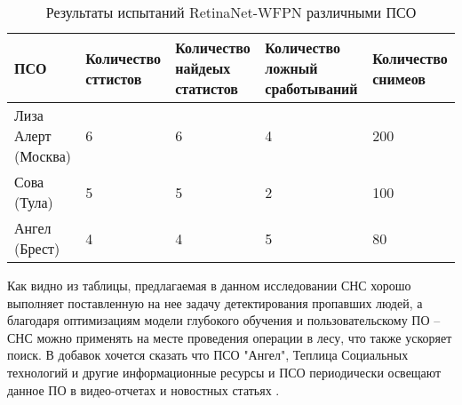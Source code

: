 \begin{table}[H]
    \caption{Результаты испытаний RetinaNet-WFPN различными ПСО}\label{leaderboard-full}
    \begin{tabular}{|p{2.8cm}|p{3cm}|p{3cm}|p{3cm}|p{3cm}|}
        \hline
        {ПСО} & {Количество сттистов} & {Количество найдеых статистов} & {Количество ложный сработываний} & {Количество снимеов} \\
        \hline
        Лиза Алерт (Москва) & 6 & 6 & 4 & 200 \\
        \hline
        Сова (Тула) & 5 & 5 & 2 & 100 \\
        \hline
        Ангел (Брест) & 4 & 4 & 5 & 80 \\
        \hline
    \end{tabular}
\end{table}

Как видно из таблицы, предлагаемая в данном исследовании СНС хорошо выполняет поставленную на нее задачу детектирования пропавших людей, а благодаря оптимизациям модели глубокого обучения и пользовательскому ПО -- СНС можно применять на месте проведения операции в лесу, что также ускоряет поиск. В добавок хочется сказать что ПСО "Ангел", Теплица Социальных технологий и другие информационные ресурсы и ПСО периодически освещают данное ПО в видео-отчетах \cite{lib-lacmus-pr1} \cite{lib-lacmus-pr2} и новостных статьях \cite{lib-lacmus-pr3} \cite{lib-lacmus-pr4} \cite{lib-lacmus-pr5}.

\clearpage